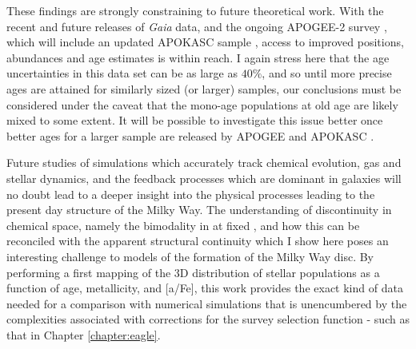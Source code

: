  These findings are strongly constraining to future theoretical work. With the recent \citep{2016arXiv160904303L} and future releases of \emph{Gaia} data, and the ongoing APOGEE-2 survey \citep{2014AAS...22344006S}, which will include an updated APOKASC sample \citep{2014ApJS..215...19P}, access to improved positions, abundances and age estimates is within reach. I again stress here that the age uncertainties in this data set can be as large as $40\%$, and so until more precise ages are attained for similarly sized (or larger) samples, our conclusions must be considered under the caveat that the mono-age populations at old age are likely mixed to some extent. It will be possible to investigate this issue better once better ages for a larger sample are released by APOGEE and APOKASC \citep{2014ApJS..215...19P}.

Future studies of simulations which accurately track chemical evolution, gas and stellar dynamics, and the feedback processes which are dominant in galaxies will no doubt lead to a deeper insight into the physical processes leading to the present day structure of the Milky Way. The understanding of discontinuity in chemical space, namely the bimodality in \afe{} at fixed \feh{}, and how this can be reconciled with the apparent structural continuity which I show here poses an interesting challenge to models of the formation of the Milky Way disc. By performing a first mapping of the 3D distribution of stellar populations as a function of age, metallicity, and [a/Fe], this work provides the exact kind of data needed for a comparison with numerical simulations that is unencumbered by the complexities associated with corrections for the survey selection function - such as that in Chapter \ref{chapter:eagle}.






